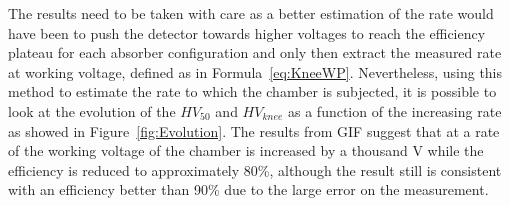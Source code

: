 	The results need to be taken with care as a better estimation of the rate would have been to push the detector towards higher voltages to reach the efficiency plateau for each absorber configuration and only then extract the measured rate at working voltage, defined as in Formula~\ref{eq:KneeWP}. Nevertheless, using this method to estimate the rate to which the chamber is subjected, it is possible to look at the evolution of the $HV_{50}$ and $HV_{knee}$ as a function of the increasing rate as showed in Figure~\ref{fig:Evolution}. The results from GIF suggest that at a rate of  the working voltage of the chamber is increased by a thousand \si{V} while the efficiency is reduced to approximately 80\%, although the result still is consistent with an efficiency better than 90\% due to the large error on the measurement.
	
